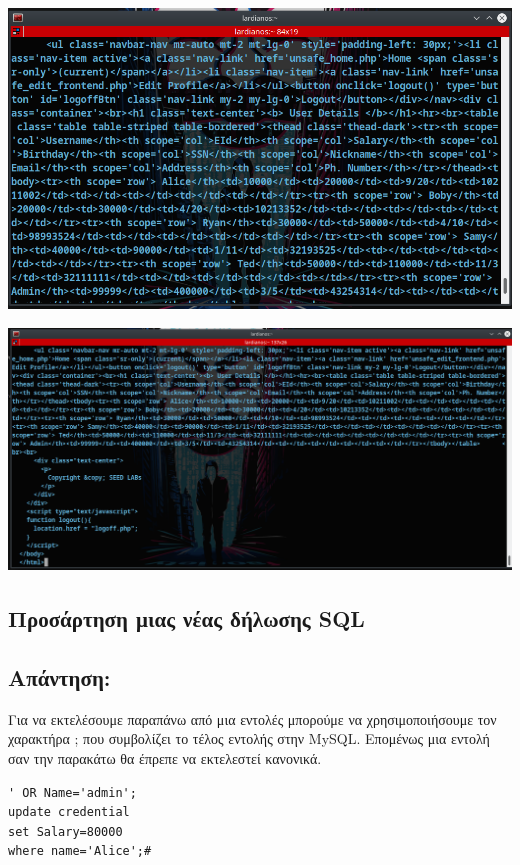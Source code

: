 \begin{center}
			\includegraphics[width=1\textwidth]{image/d2.5.2.PNG}		
\end{center}

\begin{center}
			\includegraphics[width=1\textwidth]{image/d2.5.PNG}		
\end{center}

\subsection{Προσάρτηση μιας νέας δήλωσης SQL}
\subsection*{Απάντηση:}

\noindent 
Για να εκτελέσουμε παραπάνω από μια εντολές μπορούμε να χρησιμοποιήσουμε τον χαρακτήρα ;
που συμβολίζει το τέλος εντολής στην MySQL. Επομένως μια εντολή σαν την παρακάτω θα έπρεπε να εκτελεστεί 
κανονικά.
\begin{center}
	\begin{lstlisting}	
' OR Name='admin'; 
update credential 
set Salary=80000 
where name='Alice';#
	\end{lstlisting}	
\end{center}

